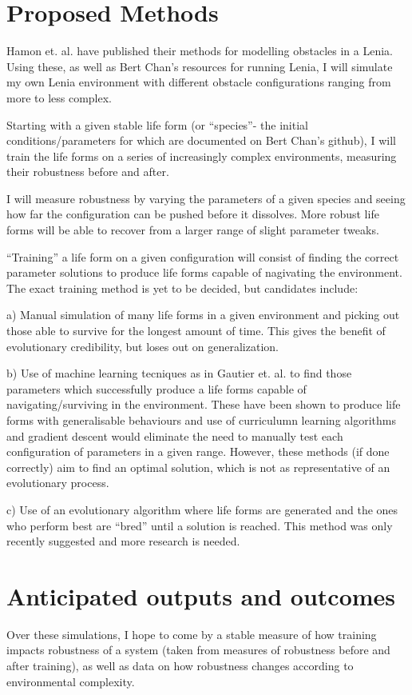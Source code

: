 \documentclass{article}
\begin{document}
\section{Proposed Methods}
Hamon et. al. have published their methods for modelling obstacles in a Lenia. Using these, as well as Bert Chan’s resources for running Lenia, I will simulate my own Lenia environment with different obstacle configurations ranging from more to less complex. 

Starting with a given stable life form (or “species”- the initial conditions/parameters for which are documented on Bert Chan’s github), I will train the life forms on a series of increasingly complex environments, measuring their robustness before and after. 

I will measure robustness by varying the parameters of a given species and seeing how far the configuration can be pushed before it dissolves. More robust life forms will be able to recover from a larger range of slight parameter tweaks. 

“Training” a life form on a given configuration will consist of finding the correct parameter solutions to produce life forms capable of nagivating the environment. The exact training method is yet to be decided, but candidates include:

	a) Manual simulation of many life forms in a given environment and picking out those able to survive for the longest amount of time. This gives the benefit of evolutionary credibility, but loses out on generalization. 
	
	b)  Use of machine learning tecniques as in Gautier et. al. to find those parameters which successfully produce a life forms capable of navigating/surviving in the environment.  These have been shown to produce life forms with generalisable behaviours and use of curriculumn learning algorithms and gradient descent would eliminate the need to manually test each configuration of parameters in a given range. However, these methods (if done correctly) aim to find an optimal solution, which is not as representative of an evolutionary process. 

c) Use of an evolutionary algorithm where life forms are generated and the ones who perform best are  “bred” until a solution is reached. This method was only recently suggested and more research is needed. 

\section{Anticipated outputs and outcomes}
Over these simulations, I hope to come by a stable measure of how training impacts robustness of a system (taken from measures of robustness before and after training), as well as data on how robustness changes according to environmental complexity. 
\end{document}
